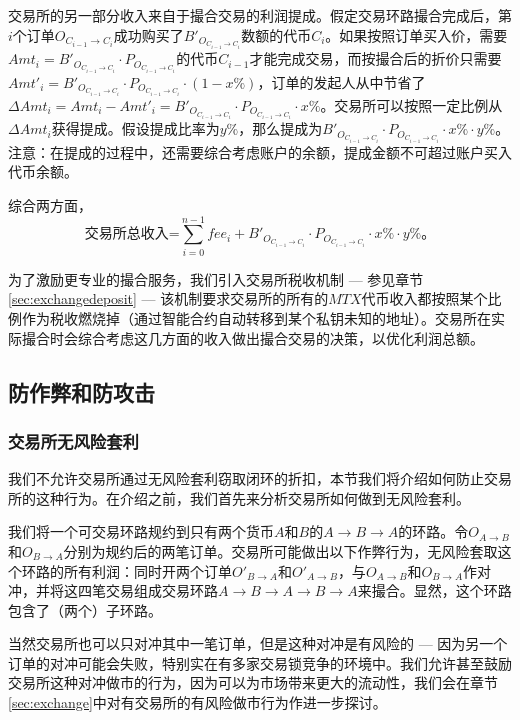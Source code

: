 \documentclass[UTF8,nofonts]{ctexart}
\begin{document}
交易所的另一部分收入来自于撮合交易的利润提成。假定交易环路撮合完成后，第$i$个订单$O_{C_{i-1}\rightarrow C_{i}}$成功购买了$B'_{O_{C_{i-1}\rightarrow C_{i}}}$数额的代币$C_{i}$。如果按照订单买入价，需要$Amt_{i}=B'_{O_{C_{i-1}\rightarrow C_{i}}}\cdot P_{O_{C_{i-1}\rightarrow C_{i}}}$的代币$C_{i-1}$才能完成交易，而按撮合后的折价只需要$Amt'_{i}=B'_{O_{C_{i-1}\rightarrow C_{i}}}\cdot P_{O_{C_{i-1}\rightarrow C_{i}}} \cdot (1-x\%)$，订单的发起人从中节省了$\Delta Amt_{i}=Amt_{i}-Amt'_{i}=B'_{O_{C_{i-1}\rightarrow C_{i}}}\cdot P_{O_{C_{i-1}\rightarrow C_{i}}} \cdot x\%$。交易所可以按照一定比例从$\Delta Amt_{i}$获得提成。假设提成比率为$y\%$，那么提成为$B'_{O_{C_{i-1}\rightarrow C_{i}}}\cdot P_{O_{C_{i-1}\rightarrow C_{i}}} \cdot x\% \cdot y\%$。注意：在提成的过程中，还需要综合考虑账户的余额，提成金额不可超过账户买入代币余额。

综合两方面，
$$
\text{交易所总收入=}\sum^{n-1}_{i=0}fee_{i} + B'_{O_{C_{i-1}\rightarrow C_{i}}}\cdot P_{O_{C_{i-1}\rightarrow C_{i}}} \cdot x\% \cdot y\%\text{。}
$$

为了激励更专业的撮合服务，我们引入交易所税收机制 --- 参见章节\ref{sec:exchangedeposit} --- 该机制要求交易所的所有的$MTX$代币收入都按照某个比例作为税收燃烧掉（通过智能合约自动转移到某个私钥未知的地址）。交易所在实际撮合时会综合考虑这几方面的收入做出撮合交易的决策，以优化利润总额。

\subsection{防作弊和防攻击}

\subsubsection{交易所无风险套利}
我们不允许交易所通过无风险套利窃取闭环的折扣，本节我们将介绍如何防止交易所的这种行为。在介绍之前，我们首先来分析交易所如何做到无风险套利。

我们将一个可交易环路规约到只有两个货币$A$和$B$的$A\rightarrow B\rightarrow A$的环路。令$O_{A\rightarrow B}$和$O_{B\rightarrow A}$分别为规约后的两笔订单。交易所可能做出以下作弊行为，无风险套取这个环路的所有利润：同时开两个订单$O'_{ B\rightarrow A}$和$O'_{ A\rightarrow B}$，与$O_{A\rightarrow B}$和$O_{B\rightarrow A}$作对冲，并将这四笔交易组成交易环路$A\rightarrow B\rightarrow A\rightarrow B\rightarrow A$来撮合。显然，这个环路包含了（两个）子环路。

当然交易所也可以只对冲其中一笔订单，但是这种对冲是有风险的 --- 因为另一个订单的对冲可能会失败，特别实在有多家交易锁竞争的环境中。我们允许甚至鼓励交易所这种对冲做市的行为，因为可以为市场带来更大的流动性，我们会在章节\ref{sec:exchange}中对有交易所的有风险做市行为作进一步探讨。
\end{document}
